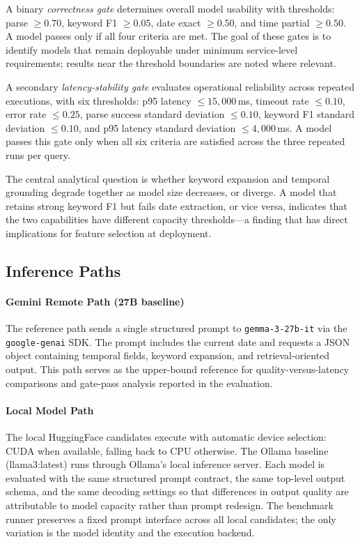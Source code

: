 \documentclass[conference]{IEEEtran}
\begin{document}
A binary \emph{correctness gate} determines overall model usability with thresholds: parse $\geq 0.70$, keyword F1 $\geq 0.05$, date exact $\geq 0.50$, and time partial $\geq 0.50$. A model passes only if all four criteria are met. The goal of these gates is to identify models that remain deployable under minimum service-level requirements; results near the threshold boundaries are noted where relevant.

A secondary \emph{latency-stability gate} evaluates operational reliability across repeated executions, with six thresholds: p95 latency $\leq 15{,}000$\,ms, timeout rate $\leq 0.10$, error rate $\leq 0.25$, parse success standard deviation $\leq 0.10$, keyword F1 standard deviation $\leq 0.10$, and p95 latency standard deviation $\leq 4{,}000$\,ms. A model passes this gate only when all six criteria are satisfied across the three repeated runs per query.

The central analytical question is whether keyword expansion and temporal grounding degrade together as model size decreases, or diverge. A model that retains strong keyword F1 but fails date extraction, or vice versa, indicates that the two capabilities have different capacity thresholds---a finding that has direct implications for feature selection at deployment.

\subsection{Inference Paths}

\paragraph{Gemini Remote Path (27B baseline)}
The reference path sends a single structured prompt to \texttt{gemma-3-27b-it} via the \texttt{google-genai} SDK. The prompt includes the current date and requests a JSON object containing temporal fields, keyword expansion, and retrieval-oriented output. This path serves as the upper-bound reference for quality-versus-latency comparisons and gate-pass analysis reported in the evaluation.

\paragraph{Local Model Path}
The local HuggingFace candidates execute with automatic device selection: CUDA when available, falling back to CPU otherwise. The Ollama baseline (llama3:latest) runs through Ollama's local inference server. Each model is evaluated with the same structured prompt contract, the same top-level output schema, and the same decoding settings so that differences in output quality are attributable to model capacity rather than prompt redesign. The benchmark runner preserves a fixed prompt interface across all local candidates; the only variation is the model identity and the execution backend.
\end{document}
